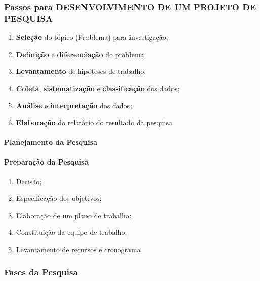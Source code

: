 \documentclass[
]{book}
\providecommand{\tightlist}{%
  \setlength{\itemsep}{0pt}\setlength{\parskip}{0pt}}
\begin{document}
\hypertarget{passos-para-desenvolvimento-de-um-projeto-de-pesquisa}{%
\subsubsection{Passos para DESENVOLVIMENTO DE UM PROJETO DE PESQUISA}\label{passos-para-desenvolvimento-de-um-projeto-de-pesquisa}}

\begin{enumerate}
\def\labelenumi{\arabic{enumi}.}
\tightlist
\item
  \textbf{Seleção} do tópico (Problema) para investigação;
\item
  \textbf{Definição} e \textbf{diferenciação} do problema;
\item
  \textbf{Levantamento} de hipóteses de trabalho;
\item
  \textbf{Coleta}, \textbf{sistematização} e \textbf{classificação} dos dados;
\item
  \textbf{Análise} e \textbf{interpretação} dos dados;
\item
  \textbf{Elaboração} do relatório do resultado da pesquisa
\end{enumerate}

\hypertarget{planejamento-da-pesquisa}{%
\paragraph{Planejamento da Pesquisa}\label{planejamento-da-pesquisa}}

\hypertarget{preparauxe7uxe3o-da-pesquisa}{%
\paragraph{Preparação da Pesquisa}\label{preparauxe7uxe3o-da-pesquisa}}

\begin{enumerate}
\def\labelenumi{\arabic{enumi}.}
\tightlist
\item
  Decisão;
\item
  Especificação dos objetivos;
\item
  Elaboração de um plano de trabalho;
\item
  Constituição da equipe de trabalho;
\item
  Levantamento de recursos e cronograma
\end{enumerate}

\hypertarget{fases-da-pesquisa}{%
\subsubsection{Fases da Pesquisa}\label{fases-da-pesquisa}}
\end{document}

